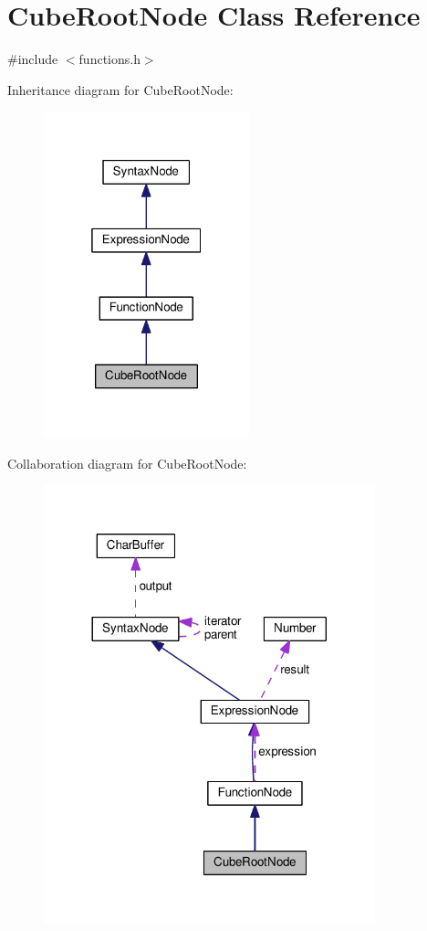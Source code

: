 \hypertarget{classCubeRootNode}{}\section{Cube\+Root\+Node Class Reference}
\label{classCubeRootNode}


{\ttfamily \#include $<$functions.\+h$>$}



Inheritance diagram for Cube\+Root\+Node\+:\nopagebreak
\begin{figure}[H]
\begin{center}
\leavevmode
\includegraphics[width=169pt]{classCubeRootNode__inherit__graph}
\end{center}
\end{figure}


Collaboration diagram for Cube\+Root\+Node\+:\nopagebreak
\begin{figure}[H]
\begin{center}
\leavevmode
\includegraphics[width=272pt]{classCubeRootNode__coll__graph}
\end{center}
\end{figure}
